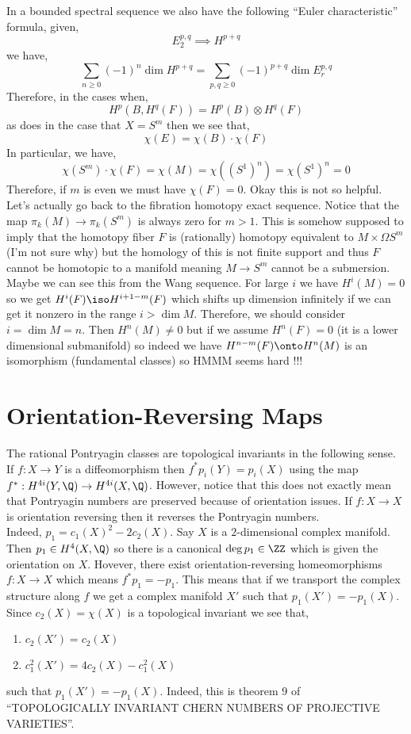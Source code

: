 \documentclass[12pt]{article}
\begin{document}
In a bounded spectral sequence we also have the following ``Euler characteristic'' formula, given,
\[ E^{p,q}_2 \implies H^{p+q} \]
we have,
\[ \sum_{n \ge 0} (-1)^n \dim{H^{p+q}} = \sum_{p,q \ge 0} (-1)^{p+q} \dim{E^{p,q}_r} \]
Therefore, in the cases when,
\[ H^p(B, H^q(F)) = H^p(B) \otimes H^q(F) \]
as does in the case that $X = S^m$ then we see that,
\[ \chi(E) = \chi(B) \cdot \chi(F) \]
In particular, we have,
\[ \chi(S^m) \cdot \chi(F) = \chi(M) = \chi((S^1)^n) = \chi(S^1)^n = 0 \]
Therefore, if $m$ is even we must have $\chi(F) = 0$. Okay this is not so helpful. 
\bigskip\\
Let's actually go back to the fibration homotopy exact sequence. Notice that the map $\pi_k(M) \to \pi_k(S^m)$ is always zero for $m > 1$. This is somehow supposed to imply that the homotopy fiber $F$ is (rationally) homotopy equivalent to $M \times \Omega S^m$ (I'm not sure why) but the homology of this is not finite support and thus $F$ cannot be homotopic to a manifold meaning $M \to S^m$ cannot be a submersion. 
\bigskip\\
Maybe we can see this from the Wang sequence. For large $i$ we have $H^i(M) = 0$ so we get $H^{i}(F) \iso H^{i+1-m}(F)$ which shifts up dimension infinitely if we can get it nonzero in the range $i > \dim{M}$. Therefore, we should consider $i = \dim{M} = n$. Then $H^n(M) \neq 0$ but if we assume $H^n(F) = 0$ (it is a lower dimensional submanifold) so indeed we have $H^{n-m}(F) \onto H^n(M)$ is an isomorphism (fundamental classes) so HMMM seems hard !!!

\section{Orientation-Reversing Maps}

The rational Pontryagin classes are topological invariants in the following sense. If $f : X \to Y$ is a diffeomorphism then $f^* p_i(Y) = p_i(X)$ using the map $f^* : H^{4i}(Y, \Q) \to H^{4i}(X, \Q)$. However, notice that this does not exactly mean that Pontryagin numbers are preserved because of orientation issues. If $f : X \to X$ is orientation reversing then it reverses the Pontryagin numbers. 
\bigskip\\
Indeed, $p_1 = c_1(X)^2 - 2 c_2(X)$. Say $X$ is a $2$-dimensional complex manifold. Then $p_1 \in H^4(X, \Q)$ so there is a canonical $\deg{p_1} \in \ZZ$ which is given the orientation on $X$. Hovever, there exist orientation-reversing homeomorphisms $f : X \to X$ which means $f^* p_1 = -p_1$. This means that if we transport the complex structure along $f$ we get a complex manifold $X'$ such that $p_1(X') = -p_1(X)$. Since $c_2(X) = \chi(X)$ is a topological invariant we see that,
\begin{enumerate}
\item $c_2(X') = c_2(X)$
\item $c_1^2(X') = 4 c_2(X) - c_1^2(X)$
\end{enumerate}
such that $p_1(X') = - p_1(X)$. Indeed, this is theorem 9 of ``TOPOLOGICALLY INVARIANT CHERN NUMBERS OF PROJECTIVE VARIETIES''. 
\end{document}
